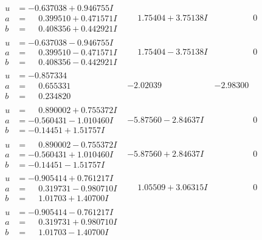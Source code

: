 \documentclass[1p]{elsarticle_modified}
\theoremstyle{definition}
\begin{document}
$$\begin{array}{c|c|c}
\begin{aligned}
u &= -0.637038 + 0.946755 I \\
a &= \phantom{-}0.399510 + 0.471571 I \\
b &= \phantom{-}0.408356 + 0.442921 I\end{aligned}
 & \phantom{-}1.75404 + 3.75138 I & \phantom{-0.000000 } 0 \\ \hline\begin{aligned}
u &= -0.637038 - 0.946755 I \\
a &= \phantom{-}0.399510 - 0.471571 I \\
b &= \phantom{-}0.408356 - 0.442921 I\end{aligned}
 & \phantom{-}1.75404 - 3.75138 I & \phantom{-0.000000 } 0 \\ \hline\begin{aligned}
u &= -0.857334\phantom{ +0.000000I} \\
a &= \phantom{-}0.655331\phantom{ +0.000000I} \\
b &= \phantom{-}0.234820\phantom{ +0.000000I}\end{aligned}
 & -2.02039\phantom{ +0.000000I} & -2.98300\phantom{ +0.000000I} \\ \hline\begin{aligned}
u &= \phantom{-}0.890002 + 0.755372 I \\
a &= -0.560431 - 1.010460 I \\
b &= -0.14451 + 1.51757 I\end{aligned}
 & -5.87560 - 2.84637 I & \phantom{-0.000000 } 0 \\ \hline\begin{aligned}
u &= \phantom{-}0.890002 - 0.755372 I \\
a &= -0.560431 + 1.010460 I \\
b &= -0.14451 - 1.51757 I\end{aligned}
 & -5.87560 + 2.84637 I & \phantom{-0.000000 } 0 \\ \hline\begin{aligned}
u &= -0.905414 + 0.761217 I \\
a &= \phantom{-}0.319731 - 0.980710 I \\
b &= \phantom{-}1.01703 + 1.40700 I\end{aligned}
 & \phantom{-}1.05509 + 3.06315 I & \phantom{-0.000000 } 0 \\ \hline\begin{aligned}
u &= -0.905414 - 0.761217 I \\
a &= \phantom{-}0.319731 + 0.980710 I \\
b &= \phantom{-}1.01703 - 1.40700 I\end{aligned}

\end{array}$$
\end{document}
